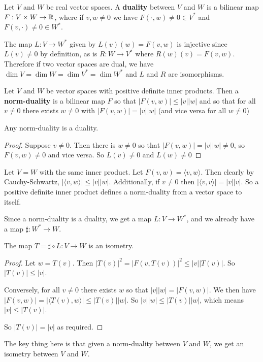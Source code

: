 \begin{defn}[Duality]
Let $V$ and $W$ be real vector spaces. A \textbf{duality} between $V$ and $W$ is a bilinear map $F : V\times W \to \operatorname{\mathbb{R}}$, where if $v,w\neq 0$ we have $F(\cdot,w)\neq 0 \in V^*$ and $F(v,\cdot)\neq 0\in W^*$.
\end{defn}
\begin{remark*}
    The map $L : V\to W^*$ given by $L(v)(w) = F(v,w)$ is injective since $L(v)\neq 0$ by definition, as is $R : W\to V^*$ where $R(w)(v)=F(v,w)$. Therefore if two vector spaces are dual, we have $\dim V = \dim W = \dim V^* = \dim W^*$ and $L$ and $R$ are isomorphisms.
\end{remark*}
\begin{defn}
Let $V$ and $W$ be vector spaces with positive definite inner products. Then a \textbf{norm-duality} is a bilinear map $F$ so that $|F(v,w)|\leq |v||w|$ and so that for all $v\neq 0$ there exists $w\neq 0$ with $|F(v,w)|=|v||w|$ (and vice versa for all $w\neq 0$)
\end{defn}
\begin{lemma}
    Any norm-duality is a duality.
\end{lemma}
\begin{proof}
    Suppose $v\neq 0$. Then there is $w\neq 0$ so that $|F(v,w)|=|v||w|\neq 0$, so $F(v,w)\neq 0$ and vice versa. So $L(v)\neq 0$ and $L(w)\neq 0$
\end{proof}
\begin{example}
    Let $V=W$ with the same inner product. Let $F(v,w) = \langle v,w\rangle$. Then clearly by Cauchy-Schwartz, $|\langle v,w\rangle | \leq |v||w|$. Additionally, if $v\neq 0$ then $|\langle v,v\rangle| = |v||v|$. So a positive definite inner product defines a norm-duality from a vector space to itself.
\end{example}

\begin{remark*}
    Since a norm-duality is a duality, we get a map $L : V \to W^*$, and we already have a map $\sharp : W^* \to W$.
\end{remark*}
\begin{lemma}
    The map $T = \sharp\circ L : V\to W$ is an isometry.
\end{lemma}
\begin{proof}
    Let $w = T(v)$. Then $|T(v)|^2 = |F(v,T(v))|^2 \leq |v||T(v)|$. So $|T(v)|\leq |v|$. 

    Conversely, for all $v\neq 0$ there exists $w$ so that $|v||w| = |F(v,w)|$. We then have $|F(v,w)| = |\langle T(v),w\rangle| \leq |T(v)||w|$. So $|v||w|\leq |T(v)||w|$, which means $|v|\leq |T(v)|$.

    So $|T(v)|=|v|$ as required.
\end{proof}
\begin{remark*}
    The key thing here is that given a norm-duality between $V$ and $W$, we get an isometry between $V$ and $W$.
\end{remark*}
\fi

